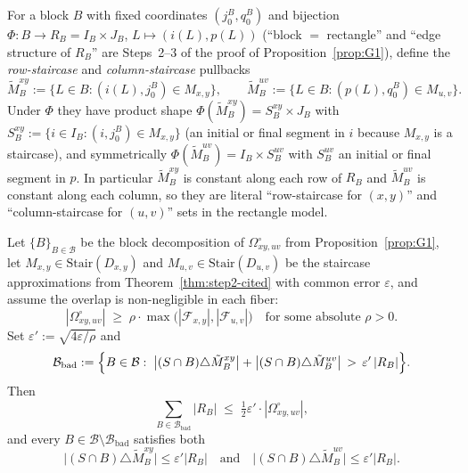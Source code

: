 For a block $B$ with fixed coordinates $(j_0^B,q_0^B)$ and bijection
$\Phi\colon B\to R_B=I_B\times J_B$, $L\mapsto(i(L),p(L))$
(``block $=$ rectangle'' and ``edge structure of $R_B$'' are
Steps~2--3 of the proof of Proposition~\ref{prop:G1}), define the
\emph{row-staircase} and
\emph{column-staircase} pullbacks
\[
\tilde M_B^{xy}:=\bigl\{L\in B:(i(L),j_0^B)\in M_{x,y}\bigr\},
\qquad
\tilde M_B^{uv}:=\bigl\{L\in B:(p(L),q_0^B)\in M_{u,v}\bigr\}.
\]
Under $\Phi$ they have product shape
$\Phi(\tilde M_B^{xy})=S_B^{xy}\times J_B$ with
$S_B^{xy}:=\{i\in I_B:(i,j_0^B)\in M_{x,y}\}$ (an initial or final
segment in $i$ because $M_{x,y}$ is a staircase), and symmetrically
$\Phi(\tilde M_B^{uv})=I_B\times S_B^{uv}$ with $S_B^{uv}$ an initial
or final segment in $p$. In particular $\tilde M_B^{xy}$ is constant
along each row of $R_B$ and $\tilde M_B^{uv}$ is constant along each
column, so they are literal ``row-staircase for $(x,y)$'' and
``column-staircase for $(u,v)$'' sets in the rectangle model.

\begin{proposition}
\label{prop:G2-step4}
Let $\{B\}_{B\in\mathcal B}$ be the block decomposition of
$\Omega^\circ_{xy,uv}$ from Proposition~\ref{prop:G1}, let
$M_{x,y}\in\mathrm{Stair}(D_{x,y})$ and
$M_{u,v}\in\mathrm{Stair}(D_{u,v})$ be the staircase approximations
from Theorem~\ref{thm:step2-cited} with common error $\varepsilon$, and
assume the overlap is non-negligible in each fiber:
\begin{equation}\label{eq:G2-rho}
|\Omega^\circ_{xy,uv}|\;\ge\;\rho\cdot
\max\!\bigl(|\mathcal F_{x,y}|,|\mathcal F_{u,v}|\bigr)
\quad\text{for some absolute }\rho>0.
\end{equation}
Set $\varepsilon':=\sqrt{4\varepsilon/\rho}$ and
\[
\mathcal B_{\mathrm{bad}}:=\Bigl\{B\in\mathcal B:\;
\bigl|(S\cap B)\triangle\tilde M_B^{xy}\bigr|
+\bigl|(S\cap B)\triangle\tilde M_B^{uv}\bigr|
\,>\,\varepsilon'\,|R_B|\Bigr\}.
\]
Then
\begin{equation}\label{eq:G2-bad}
\sum_{B\in\mathcal B_{\mathrm{bad}}}|R_B|
\;\le\;\tfrac{1}{2}\varepsilon'\cdot|\Omega^\circ_{xy,uv}|,
\end{equation}
and every $B\in\mathcal B\setminus\mathcal B_{\mathrm{bad}}$ satisfies
both
\[
\bigl|(S\cap B)\triangle\tilde M_B^{xy}\bigr|\le\varepsilon'|R_B|
\quad\text{and}\quad
\bigl|(S\cap B)\triangle\tilde M_B^{uv}\bigr|\le\varepsilon'|R_B|.
\]
\end{proposition}

